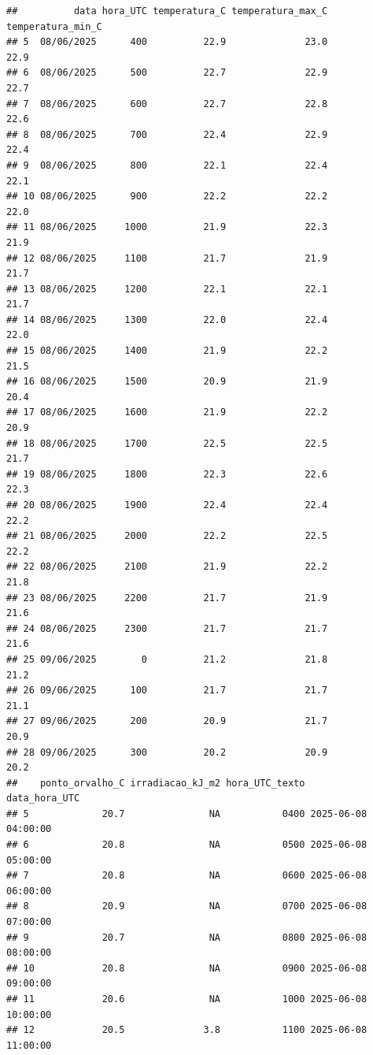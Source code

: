 \documentclass[
]{article}
\begin{document}
\begin{verbatim}
##          data hora_UTC temperatura_C temperatura_max_C temperatura_min_C
## 5  08/06/2025      400          22.9              23.0              22.9
## 6  08/06/2025      500          22.7              22.9              22.7
## 7  08/06/2025      600          22.7              22.8              22.6
## 8  08/06/2025      700          22.4              22.9              22.4
## 9  08/06/2025      800          22.1              22.4              22.1
## 10 08/06/2025      900          22.2              22.2              22.0
## 11 08/06/2025     1000          21.9              22.3              21.9
## 12 08/06/2025     1100          21.7              21.9              21.7
## 13 08/06/2025     1200          22.1              22.1              21.7
## 14 08/06/2025     1300          22.0              22.4              22.0
## 15 08/06/2025     1400          21.9              22.2              21.5
## 16 08/06/2025     1500          20.9              21.9              20.4
## 17 08/06/2025     1600          21.9              22.2              20.9
## 18 08/06/2025     1700          22.5              22.5              21.7
## 19 08/06/2025     1800          22.3              22.6              22.3
## 20 08/06/2025     1900          22.4              22.4              22.2
## 21 08/06/2025     2000          22.2              22.5              22.2
## 22 08/06/2025     2100          21.9              22.2              21.8
## 23 08/06/2025     2200          21.7              21.9              21.6
## 24 08/06/2025     2300          21.7              21.7              21.6
## 25 09/06/2025        0          21.2              21.8              21.2
## 26 09/06/2025      100          21.7              21.7              21.1
## 27 09/06/2025      200          20.9              21.7              20.9
## 28 09/06/2025      300          20.2              20.9              20.2
##    ponto_orvalho_C irradiacao_kJ_m2 hora_UTC_texto       data_hora_UTC
## 5             20.7               NA           0400 2025-06-08 04:00:00
## 6             20.8               NA           0500 2025-06-08 05:00:00
## 7             20.8               NA           0600 2025-06-08 06:00:00
## 8             20.9               NA           0700 2025-06-08 07:00:00
## 9             20.7               NA           0800 2025-06-08 08:00:00
## 10            20.8               NA           0900 2025-06-08 09:00:00
## 11            20.6               NA           1000 2025-06-08 10:00:00
## 12            20.5              3.8           1100 2025-06-08 11:00:00

\end{verbatim}
\end{document}

